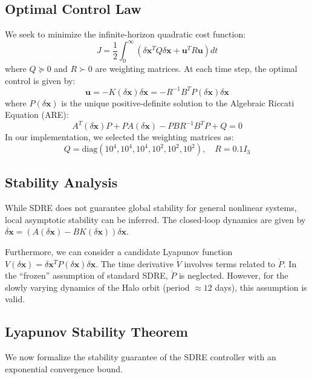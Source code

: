 \documentclass[10pt,letterpaper]{article}
\begin{document}
\subsection{Optimal Control Law}
We seek to minimize the infinite-horizon quadratic cost function:
\begin{equation}
    J = \frac{1}{2} \int_{0}^{\infty} \left( \delta \mathbf{x}^T Q \delta \mathbf{x} + \mathbf{u}^T R \mathbf{u} \right) dt
\end{equation}
where $Q \succeq 0$ and $R \succ 0$ are weighting matrices. At each time step, the optimal control is given by:
\begin{equation}
    \mathbf{u} = -K(\delta \mathbf{x}) \delta \mathbf{x} = -R^{-1} B^T P(\delta \mathbf{x}) \delta \mathbf{x}
\end{equation}
where $P(\delta \mathbf{x})$ is the unique positive-definite solution to the Algebraic Riccati Equation (ARE):
\begin{equation}
    A^T(\delta \mathbf{x}) P + P A(\delta \mathbf{x}) - P B R^{-1} B^T P + Q = 0
\end{equation}
In our implementation, we selected the weighting matrices as:
\begin{equation}
    Q = \text{diag}(10^4, 10^4, 10^4, 10^2, 10^2, 10^2), \quad R = 0.1 I_3
\end{equation}

\subsection{Stability Analysis}
While SDRE does not guarantee global stability for general nonlinear systems, local asymptotic stability can be inferred. The closed-loop dynamics are given by $\dot{\delta \mathbf{x}} = (A(\delta \mathbf{x}) - B K(\delta \mathbf{x})) \delta \mathbf{x}$.

Furthermore, we can consider a candidate Lyapunov function $V(\delta \mathbf{x}) = \delta \mathbf{x}^T P(\delta \mathbf{x}) \delta \mathbf{x}$. The time derivative $\dot{V}$ involves terms related to $\dot{P}$. In the ``frozen'' assumption of standard SDRE, $\dot{P}$ is neglected. However, for the slowly varying dynamics of the Halo orbit (period $\approx 12$ days), this assumption is valid.

\subsection{Lyapunov Stability Theorem}
We now formalize the stability guarantee of the SDRE controller with an exponential convergence bound.
\end{document}
